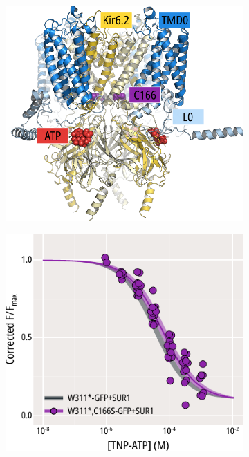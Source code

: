 \begin{figure}[h]
	\centering
	\begin{subfigure}[t]{0.45\textwidth}
		\caption{}\label{ch5fig:c166s_loc}
		\centering
		\includegraphics[width=\textwidth]{c166s_1.pdf}
	\end{subfigure}
	\hfill
	\begin{subfigure}[t]{0.45\textwidth}
		\caption{}\label{ch5fig:c166s_popfits}
		\centering
		\includegraphics[width=\textwidth]{c166s_2.pdf}

\end{subfigure}
\end{figure}
